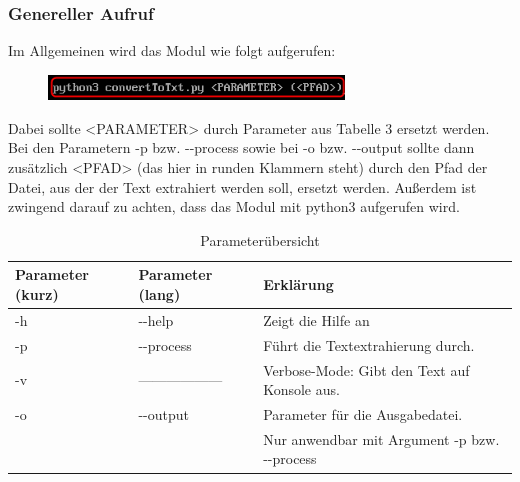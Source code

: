 \documentclass[12pt]{scrartcl}
\begin{document}
\subsubsection{Genereller Aufruf}
\label{sec:first-steps-general}
Im Allgemeinen wird das Modul wie folgt aufgerufen:
\begin{figure}[htbp]
\centering
\includegraphics[width=0.7\textwidth]{ersteSchritte001}\par\vspace{0.25cm}
\label{fig:ersteSchritteGeneral001}
\end{figure}
\newline
Dabei sollte <PARAMETER> durch Parameter aus Tabelle 3 ersetzt werden. Bei  den Parametern -p bzw. -{}-process sowie bei -o bzw. -{}-output sollte dann zusätzlich <PFAD> (das hier in runden Klammern steht) durch den Pfad der Datei, aus der der Text extrahiert werden soll, ersetzt werden. 
Außerdem ist zwingend darauf zu achten, dass das Modul mit python3 aufgerufen wird.
\begin{table}[H]
\begin{center}
\label{params}
\begin{tabular}{|l|l|l|}
\hline
\rowcolor[HTML]{C0C0C0} 
Parameter (kurz) & Parameter (lang) & Erklärung                                                                                                                              \\ \hline
-h               & -{}-help           & Zeigt die Hilfe an                                                                                                                     \\ \hline
-p               & -{}-process        & Führt die Textextrahierung durch.  \\ \hline
-v				 & ------------------ & Verbose-Mode: Gibt den Text auf Konsole aus. \\ \hline
-o               & -{}-output         & Parameter für die Ausgabedatei.\\
				 &					  &	Nur anwendbar mit Argument -p bzw. -{}-process \\ \hline
\end{tabular}
\caption{Parameterübersicht}
\end{center}
\end{table}
\end{document}
